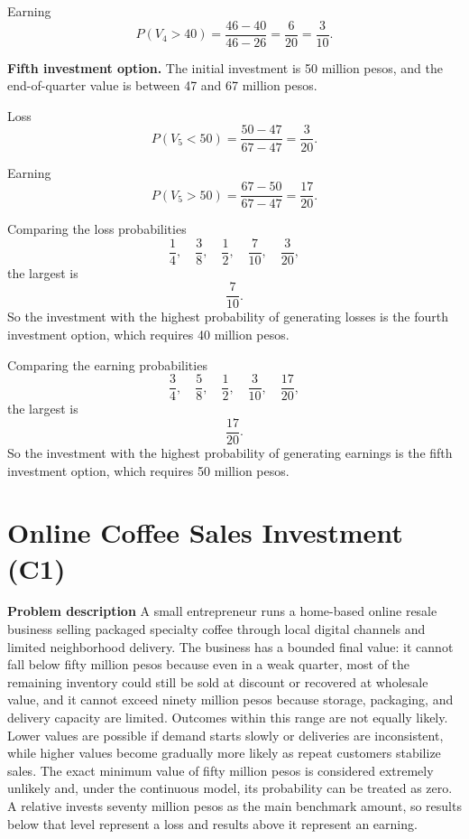 	Earning
	\[
	P(V_4>40)=\frac{46-40}{46-26}=\frac{6}{20}=\frac{3}{10}.
	\]
	
	\medskip
	
	\textbf{Fifth investment option.}
	The initial investment is 50 million pesos, and the end-of-quarter value is between 47 and 67 million pesos.
	
	Loss
	\[
	P(V_5<50)=\frac{50-47}{67-47}=\frac{3}{20}.
	\]
	
	Earning
	\[
	P(V_5>50)=\frac{67-50}{67-47}=\frac{17}{20}.
	\]
	
	Comparing the loss probabilities
	\[
	\frac14,\quad \frac38,\quad \frac12,\quad \frac{7}{10},\quad \frac{3}{20},
	\]
	the largest is
	\[
	\frac{7}{10}.
	\]
	So the investment with the highest probability of generating losses is the fourth investment option, which requires 40 million pesos.
	
	Comparing the earning probabilities
	\[
	\frac34,\quad \frac58,\quad \frac12,\quad \frac{3}{10},\quad \frac{17}{20},
	\]
	the largest is
	\[
	\frac{17}{20}.
	\]
	So the investment with the highest probability of generating earnings is the fifth investment option, which requires 50 million pesos.
	
	\section{Online Coffee Sales Investment (C1)}
	
	\textbf{Problem description}
	A small entrepreneur runs a home-based online resale business selling packaged specialty coffee through local digital channels and limited neighborhood delivery. The business has a bounded final value: it cannot fall below fifty million pesos because even in a weak quarter, most of the remaining inventory could still be sold at discount or recovered at wholesale value, and it cannot exceed ninety million pesos because storage, packaging, and delivery capacity are limited. Outcomes within this range are not equally likely. Lower values are possible if demand starts slowly or deliveries are inconsistent, while higher values become gradually more likely as repeat customers stabilize sales. The exact minimum value of fifty million pesos is considered extremely unlikely and, under the continuous model, its probability can be treated as zero. A relative invests seventy million pesos as the main benchmark amount, so results below that level represent a loss and results above it represent an earning.
	
